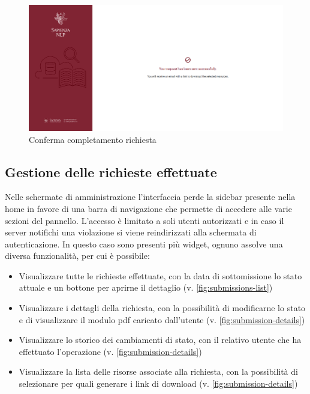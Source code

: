 \begin{figure}[H]
	\centering
	\includegraphics[width=\textwidth]{assets/ui/request-success.png}
	\caption{Conferma completamento richiesta}
	\label{fig:request-success}
\end{figure}


\subsection{Gestione delle richieste effettuate} \label{subsec:submissions-list}
Nelle schermate di amministrazione l'interfaccia perde la sidebar presente nella
home in favore di una barra di navigazione che permette di accedere alle varie
sezioni del pannello. L'accesso è limitato a soli utenti autorizzati e in caso
il server notifichi una violazione si viene reindirizzati alla schermata di
autenticazione. In questo caso sono presenti più widget, ognuno assolve una
diversa funzionalità, per cui è possibile:
\begin{itemize}
	\item Visualizzare tutte le richieste effettuate, con la data di sottomissione
	lo stato attuale e un bottone per aprirne il dettaglio (v. \autoref{fig:submissions-list})
	\item Visualizzare i dettagli della richiesta, con la possibilità di
	modificarne lo stato e di visualizzare il modulo pdf caricato dall'utente (v. \autoref{fig:submission-details})
	\item Visualizzare lo storico dei cambiamenti di stato, con il relativo utente
	che ha effettuato l'operazione (v. \autoref{fig:submission-details})
	\item Visualizzare la lista delle risorse associate alla richiesta, con la
	possibilità di selezionare per quali generare i link di download (v. \autoref{fig:submission-details})
\end{itemize}

